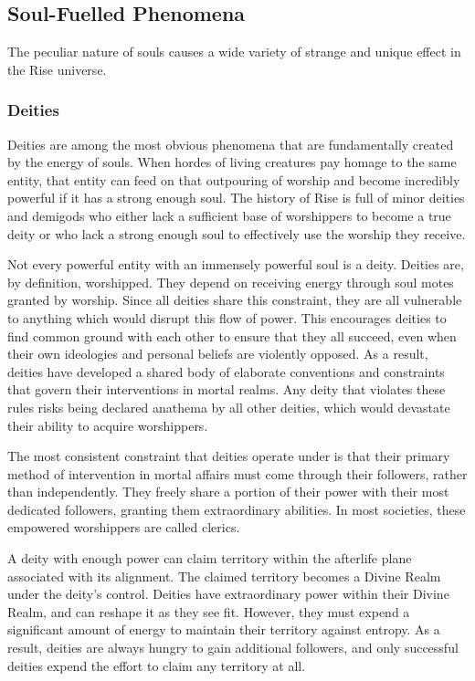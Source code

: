   \subsection{Soul-Fuelled Phenomena}

    The peculiar nature of souls causes a wide variety of strange and unique effect in the Rise universe.

    \subsubsection{Deities}
      Deities are among the most obvious phenomena that are fundamentally created by the energy of souls.
      When hordes of living creatures pay homage to the same entity, that entity can feed on that outpouring of worship and become incredibly powerful if it has a strong enough soul.
      The history of Rise is full of minor deities and demigods who either lack a sufficient base of worshippers to become a true deity or who lack a strong enough soul to effectively use the worship they receive.

      Not every powerful entity with an immensely powerful soul is a deity.
      Deities are, by definition, worshipped.
      They depend on receiving energy through soul motes granted by worship.
      Since all deities share this constraint, they are all vulnerable to anything which would disrupt this flow of power.
      This encourages deities to find common ground with each other to ensure that they all succeed, even when their own ideologies and personal beliefs are violently opposed.
      As a result, deities have developed a shared body of elaborate conventions and constraints that govern their interventions in mortal realms.
      Any deity that violates these rules risks being declared anathema by all other deities, which would devastate their ability to acquire worshippers.

      The most consistent constraint that deities operate under is that their primary method of intervention in mortal affairs must come through their followers, rather than independently.
      They freely share a portion of their power with their most dedicated followers, granting them extraordinary abilities.
      In most societies, these empowered worshippers are called clerics.

      A deity with enough power can claim territory within the afterlife plane associated with its alignment.
      The claimed territory becomes a Divine Realm under the deity's control.
      Deities have extraordinary power within their Divine Realm, and can reshape it as they see fit.
      However, they must expend a significant amount of energy to maintain their territory against entropy.
      As a result, deities are always hungry to gain additional followers, and only successful deities expend the effort to claim any territory at all.

